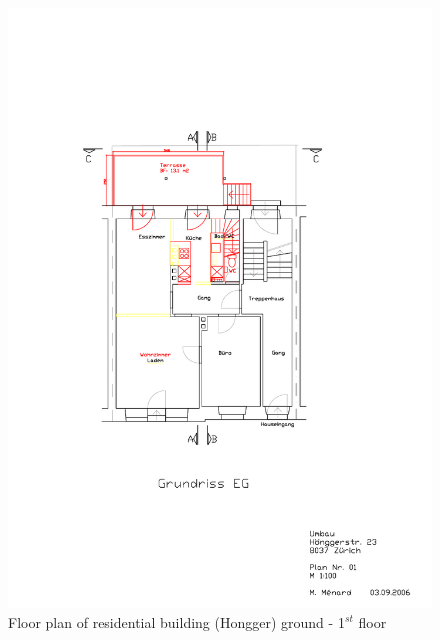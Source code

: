 \documentclass[11pt, a4paper]{article}
\theoremstyle{definition}
\begin{document}
		\begin{figure}[H]
		\centering
		\includegraphics[scale=1.4]{Hongg_EG_Plan.pdf}
		\caption{Floor plan of residential building (Hongger) ground - 1$^{st}$ floor}
		\label{fig:hongg_eg_plan}
		\end{figure}
		
\end{document}
